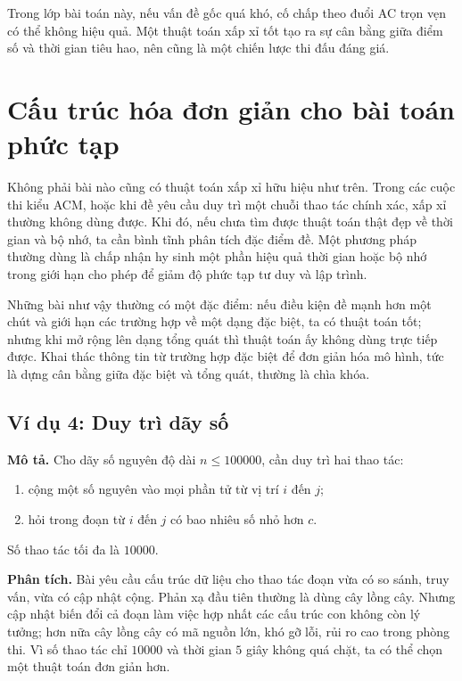 \documentclass[11pt]{article}
\begin{document}
Trong lớp bài toán này, nếu vấn đề gốc quá khó, cố chấp theo đuổi AC trọn
vẹn có thể không hiệu quả. Một thuật toán xấp xỉ tốt tạo ra sự cân bằng giữa
điểm số và thời gian tiêu hao, nên cũng là một chiến lược thi đấu đáng giá.

\section{Cấu trúc hóa đơn giản cho bài toán phức tạp}

Không phải bài nào cũng có thuật toán xấp xỉ hữu hiệu như trên. Trong các
cuộc thi kiểu ACM, hoặc khi đề yêu cầu duy trì một chuỗi thao tác chính xác,
xấp xỉ thường không dùng được. Khi đó, nếu chưa tìm được thuật toán thật đẹp
về thời gian và bộ nhớ, ta cần bình tĩnh phân tích đặc điểm đề. Một phương
pháp thường dùng là chấp nhận hy sinh một phần hiệu quả thời gian hoặc bộ
nhớ trong giới hạn cho phép để giảm độ phức tạp tư duy và lập trình.

Những bài như vậy thường có một đặc điểm: nếu điều kiện đề mạnh hơn một chút
và giới hạn các trường hợp về một dạng đặc biệt, ta có thuật toán tốt; nhưng
khi mở rộng lên dạng tổng quát thì thuật toán ấy không dùng trực tiếp được.
Khai thác thông tin từ trường hợp đặc biệt để đơn giản hóa mô hình, tức là
dựng cân bằng giữa đặc biệt và tổng quát, thường là chìa khóa.

\subsection{Ví dụ 4: Duy trì dãy số}

\textbf{Mô tả.} Cho dãy số nguyên độ dài \(n\le 100000\), cần duy trì hai
thao tác:
\begin{enumerate}
  \item cộng một số nguyên vào mọi phần tử từ vị trí \(i\) đến \(j\);
  \item hỏi trong đoạn từ \(i\) đến \(j\) có bao nhiêu số nhỏ hơn \(c\).
\end{enumerate}
Số thao tác tối đa là \(10000\).

\textbf{Phân tích.} Bài yêu cầu cấu trúc dữ liệu cho thao tác đoạn vừa có so
sánh, truy vấn, vừa có cập nhật cộng. Phản xạ đầu tiên thường là dùng cây
lồng cây. Nhưng cập nhật biến đổi cả đoạn làm việc hợp nhất các cấu trúc con
không còn lý tưởng; hơn nữa cây lồng cây có mã nguồn lớn, khó gỡ lỗi, rủi ro
cao trong phòng thi. Vì số thao tác chỉ \(10000\) và thời gian \(5\) giây
không quá chặt, ta có thể chọn một thuật toán đơn giản hơn.
\end{document}
